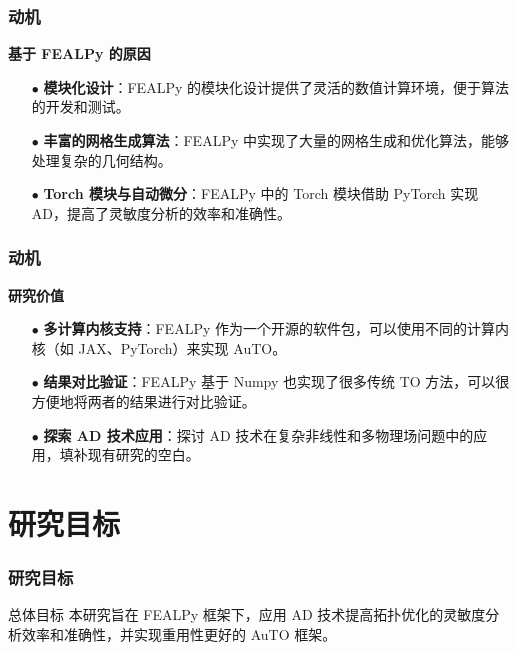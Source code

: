 \documentclass{beamer}
\numberwithin{subsection}{section}
\begin{document}

\begin{frame}
    \frametitle{动机}    
    \textbf{基于 FEALPy 的原因}
    \begin{itemize}
        \item[$\bullet$]\textbf{模块化设计}：FEALPy 的模块化设计提供了灵活的数值计算环境，便于算法的开发和测试。
        \vspace{0.3cm}
        \item[$\bullet$]\textbf{丰富的网格生成算法}：FEALPy 中实现了大量的网格生成和优化算法，能够处理复杂的几何结构。
        \vspace{0.3cm}
        \item[$\bullet$]\textbf{Torch 模块与自动微分}：FEALPy 中的 Torch 模块借助 PyTorch 实现 AD，提高了灵敏度分析的效率和准确性。
    \end{itemize}
\end{frame}


\begin{frame}
    \frametitle{动机}
    \textbf{研究价值}
    \begin{itemize}
        \item[$\bullet$]\textbf{多计算内核支持}：FEALPy 作为一个开源的软件包，可以使用不同的计算内核（如 JAX、PyTorch）来实现 AuTO。
        \vspace{0.3cm}
        \item[$\bullet$]\textbf{结果对比验证}：FEALPy 基于 Numpy 也实现了很多传统 TO 方法，可以很方便地将两者的结果进行对比验证。
        \vspace{0.3cm}
        \item[$\bullet$]\textbf{探索 AD 技术应用}：探讨 AD 技术在复杂非线性和多物理场问题中的应用，填补现有研究的空白。
    \end{itemize}
    
\end{frame}


\section{研究目标}

\begin{frame}
    \frametitle{研究目标}
    \begin{block}{总体目标}
		本研究旨在 FEALPy 框架下，应用 AD 技术提高拓扑优化的灵敏度分析效率和准确性，并实现重用性更好的 AuTO 框架。
	\end{block}
\end{frame}
\end{document}

